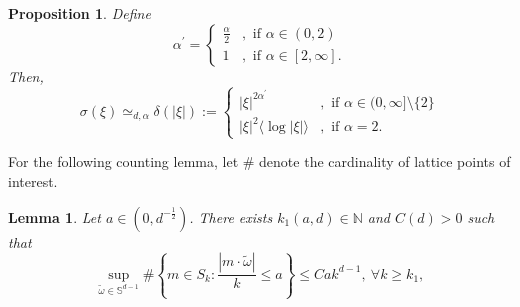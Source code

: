 \documentclass{article}
\numberwithin{equation}{section}
\newtheorem{lemma}{Lemma}[section]
\newtheorem{proposition}{Proposition}[section]
\begin{document}
\begin{proposition}\label{l3}
Define  
\begin{equation}\label{prime}
    \alpha^\prime = 
    \begin{cases}
        \frac{\alpha}{2}
        & ,\text{ if } \alpha \in (0,2)\\
        1 & ,\text{ if } \alpha \in [2,\infty].
\end{cases}    
\end{equation}
Then,
\begin{equation}\label{equivalence}
    \sigma(\xi) \simeq_{d,\alpha} \delta(|\xi|) :=
        \begin{cases}
            |\xi|^{2\alpha^{\prime}}
            & ,\text{ if } \alpha \in (0,\infty] \setminus \{2\}\\
            |\xi|^2 \langle\log |\xi|\rangle & ,\text{ if } \alpha =2.
        \end{cases}
\end{equation}
\end{proposition}
For the following counting lemma, let $\#$ denote the cardinality of lattice points of interest.






\begin{lemma}\label{count}
Let $a \in (0,d^{-\frac{1}{2}})$. There exists $k_1(a,d) \in \mathbb{N}$ and $C(d) > 0$ such that
\begin{equation*}
    \sup_{\tilde{\omega} \in \mathbb{S}^{d-1}}\#\left\{m \in S_k: \frac{|m \cdot \tilde{\omega}|}{k} \leq a\right\} \leq C ak^{d-1},\ \forall k \geq k_1,
\end{equation*}
\end{lemma}
\end{document}
